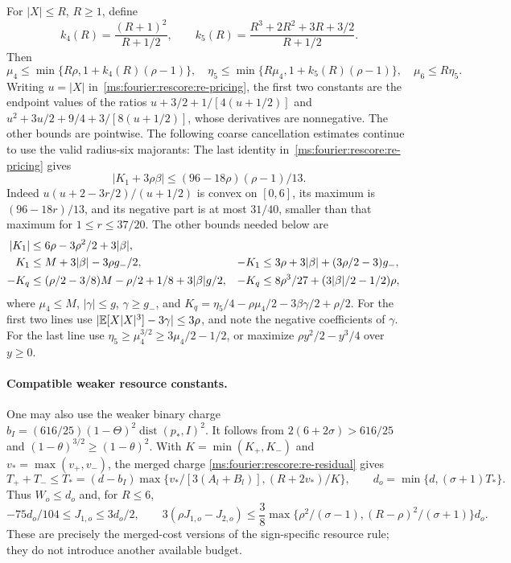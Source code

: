 For $|X|\le R$, $R\ge1$, define
\[
 k_4(R)=\frac{(R+1)^2}{R+1/2},\qquad
 k_5(R)=\frac{R^3+2R^2+3R+3/2}{R+1/2}.
\]
Then
\begin{equation}\label{ms:fourier:rescore:mom-universal-moments}
 \mu_4\le\min\{R\rho,1+k_4(R)(\rho-1)\},\quad
 \eta_5\le\min\{R\mu_4,1+k_5(R)(\rho-1)\},\quad
 \mu_6\le R\eta_5.
\end{equation}
Writing $u=|X|$ in~\eqref{ms:fourier:rescore:re-pricing}, the first two constants
are the endpoint values of the ratios
$u+3/2+1/[4(u+1/2)]$ and
$u^2+3u/2+9/4+3/[8(u+1/2)]$, whose derivatives are nonnegative.
The other bounds are pointwise. The following coarse cancellation estimates
continue to use the valid radius-six majorants:
The last identity in~\eqref{ms:fourier:rescore:re-pricing} gives
\begin{equation}\label{ms:fourier:rescore:mom-K-cancellation}
 |K_1+3\rho\beta|\le(96-18\rho)(\rho-1)/13.
\end{equation}
Indeed $u(u+2-3r/2)/(u+1/2)$ is convex on $[0,6]$, its maximum is
$(96-18r)/13$, and its negative part is at most $31/40$, smaller than that
maximum for $1\le r\le37/20$.
The other bounds needed below are
\begin{align}
 |K_1|&\le6\rho-3\rho^2/2+3|\beta|,\notag\\
 K_1&\le M+3|\beta|-3\rho g_-/2,&
 -K_1&\le3\rho+3|\beta|+(3\rho/2-3)g_-,\notag\\
 -K_q&\le(\rho/2-3/8)M-\rho/2+1/8+3|\beta|g/2,&
 -K_q&\le8\rho^3/27+(3|\beta|/2-1/2)\rho,               \label{ms:fourier:rescore:mom-K-bounds}
\end{align}
where $\mu_4\le M$, $|\gamma|\le g$, $\gamma\ge g_-$, and
$K_q=\eta_5/4-\rho\mu_4/2-3\beta\gamma/2+\rho/2$.
For the first two lines use
$|\mathbb E[X|X|^3]-3\gamma|\le3\rho$, and note the negative coefficients
of $\gamma$. For the last line use
$\eta_5\ge\mu_4^{3/2}\ge3\mu_4/2-1/2$, or maximize
$\rho y^2/2-y^3/4$ over $y\ge0$.


\paragraph{Compatible weaker resource constants.}
One may also use the weaker binary charge
$b_I=(616/25)(1-\Theta)^2\operatorname{dist}(p_*,I)^2$.
It follows from $2(6+2\sigma)>616/25$ and
$(1-\theta)^{3/2}\ge(1-\theta)^2$.
With $K=\min(K_+,K_-)$ and $v_* =\max(v_+,v_-)$, the merged charge
\eqref{ms:fourier:rescore:re-residual} gives
\[
 T_++T_-\le T_*=(d-b_I)\max\{v_*/[3(A_l+B_l)],(R+2v_*)/K\},
 \qquad d_o=\min\{d,(\sigma+1)T_*\}.
\]
Thus $W_o\le d_o$ and, for $R\le6$,
\[
 -75d_o/104\le J_{1,o}\le3d_o/2,\qquad
 3(\rho J_{1,o}-J_{2,o})\le\frac38
 \max\{\rho^2/(\sigma-1),(R-\rho)^2/(\sigma+1)\}d_o.
\]
These are precisely the merged-cost versions of the sign-specific
resource rule; they do not introduce another available budget.

